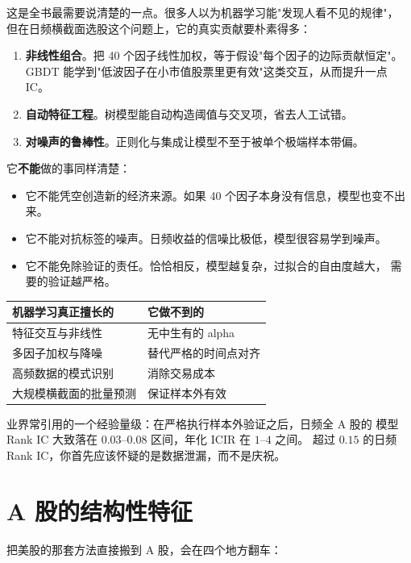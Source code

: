 这是全书最需要说清楚的一点。很多人以为机器学习能"发现人看不见的规律"，
但在日频横截面选股这个问题上，它的真实贡献要朴素得多：

\begin{enumerate}
  \item \textbf{非线性组合}。把 40 个因子线性加权，等于假设"每个因子的边际贡献恒定"。
        GBDT 能学到"低波因子在小市值股票里更有效"这类交互，从而提升一点 IC。
  \item \textbf{自动特征工程}。树模型能自动构造阈值与交叉项，省去人工试错。
  \item \textbf{对噪声的鲁棒性}。正则化与集成让模型不至于被单个极端样本带偏。
\end{enumerate}

它\textbf{不能}做的事同样清楚：

\begin{itemize}
  \item 它不能凭空创造新的经济来源。如果 40 个因子本身没有信息，模型也变不出来。
  \item 它不能对抗标签的噪声。日频收益的信噪比极低，模型很容易学到噪声。
  \item 它不能免除验证的责任。恰恰相反，模型越复杂，过拟合的自由度越大，
        需要的验证越严格。
\end{itemize}

\begin{center}
\begin{tabular}{@{}p{}p{}@{}}
\toprule
\textbf{机器学习真正擅长的} & \textbf{它做不到的} \\
\midrule
特征交互与非线性 & 无中生有的 alpha \\
多因子加权与降噪 & 替代严格的时间点对齐 \\
高频数据的模式识别 & 消除交易成本 \\
大规模横截面的批量预测 & 保证样本外有效 \\
\bottomrule
\end{tabular}
\end{center}

业界常引用的一个经验量级：在严格执行样本外验证之后，日频全 A 股的
模型 Rank IC 大致落在 $0.03$--$0.08$ 区间，年化 ICIR 在 $1$--$4$ 之间。
超过 $0.15$ 的日频 Rank IC，你首先应该怀疑的是数据泄漏，而不是庆祝。

\section{A 股的结构性特征}

把美股的那套方法直接搬到 A 股，会在四个地方翻车：

